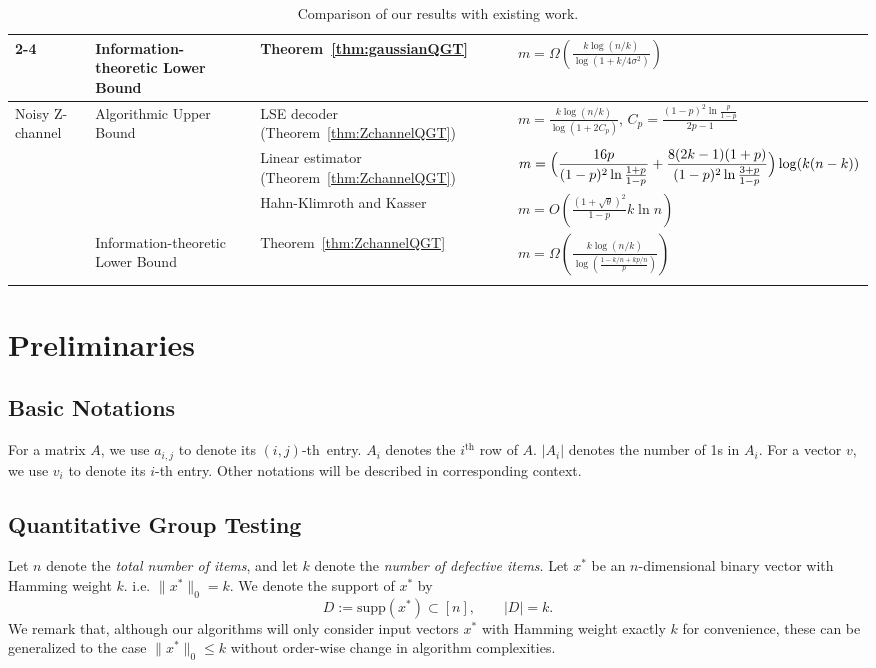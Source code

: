 \documentclass{article}
\newcommand{\supp}{\mathrm{supp}}
\begin{document}
\begin{table}[t]
\begin{tabular}{p{2.2cm} p{3.6cm} p{4.6cm} p{7.0cm}}
\cline{2-4}

& Information-theoretic Lower Bound
& Theorem~\ref{thm:gaussianQGT}
& $\displaystyle m = \Omega\!\left(\frac{k\log(n/k)}{\log(1+k/4\sigma^2)}\right)$
\\

\hline

\multirow{4}{*}{Noisy Z-channel}
& \multirow{3}{*}{Algorithmic Upper Bound}
& LSE decoder (Theorem~\ref{thm:ZchannelQGT})
& $\displaystyle m = \frac{k\log(n/k)}{\log(1+2C_p)}$, $C_p=\frac{(1-p)^2\ln\frac{p}{1-p}}{2p-1}$
\\

& & Linear estimator (Theorem~\ref{thm:ZchannelQGT})
& $\displaystyle m =
\Bigl(
\frac{16p}{(1-p)^2\ln\frac{1+p}{1-p}}
+
\frac{8(2k-1)(1+p)}{(1-p)^2\ln\frac{3+p}{1-p}}
\Bigr)\log(k(n-k))$
\\

& & Hahn-Klimroth and Kasser~\cite{hahn-klimroth_distributed_2022}
& $\displaystyle m =O\left(\frac{(1+\sqrt{\theta})^2}{1-p}k\ln n\right)$
\\

\cline{2-4}

& Information-theoretic Lower Bound
& Theorem~\ref{thm:ZchannelQGT}
& $\displaystyle m =\Omega\left( \frac{k\log(n/k)}{\log(\frac{1-k/n+kp/n}{p})}\right)$
\\
\hline
\\
\end{tabular}

\caption{Comparison of our results with existing work.}
\label{tab:result summary}
\end{table}

\section{Preliminaries}\label{sec:preliminaries}
\subsection{Basic Notations}
For a matrix $A$, we use $a_{i,j}$ to denote its $(i, j)$-th entry. $A_i$ denotes the $i^{\text{th}}$ row of $A$. $|A_i|$ denotes the number of 1s in $A_i$. For a vector $v$, we use $v_i$ to denote its $i$-th entry. Other notations will be described in corresponding context.

\subsection{Quantitative Group Testing}
Let $n$ denote the \emph{total number of items}, and let $k$ denote the \emph{number of defective items}. Let $x^*$ be an $n$-dimensional binary vector with Hamming weight $k$. i.e. $\|x^*\|_0=k$. We denote the support of $x^*$ by
\[
D := \supp(x^*) \subset [n], \qquad |D| = k.
\]
We remark that, although our algorithms will only consider input vectors $x^*$ with Hamming weight exactly $k$ for convenience, these can be generalized to the case $\|x^*\|_0\leq k$ without order-wise change in algorithm complexities. 
\end{document}
